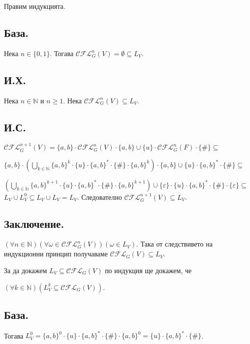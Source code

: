 \documentclass[12pt]{article}
\begin{document}
Правим индукцията.

\subsection*{База.}
Нека \(n \in \{0, 1\}\). Тогава \(\mathcal{CFL}_G^n(V) = \emptyset \subseteq L_V\).

\subsection*{И.Х.}
Нека \(n \in \mathbb{N}\) и \(n \geq 1\). Нека \(\mathcal{CFL}_G^n(V) \subseteq L_V\).

\subsection*{И.С.}
\(\mathcal{CFL}_G^{n + 1}(V) = \{a, b\} \cdot \mathcal{CFL}_G^n(V) \cdot \{a, b\} \cup \{u\} \cdot \mathcal{CFL}_G^n(F) \cdot \{\#\} \subseteq\)

\(\{a, b\} \cdot \left(\displaystyle\bigcup_{k \in \mathbb{N}} \{a, b\}^k \cdot \{u\} \cdot \{a, b\}^* \cdot \{\#\} \cdot \{a, b\}^k\right) \cdot \{a, b\} \cup \{u\} \cdot \{a, b\}^* \cdot \{\#\} \subseteq\)

\(\left(\displaystyle\bigcup_{k \in \mathbb{N}} \{a, b\}^{k + 1} \cdot \{u\} \cdot \{a, b\}^* \cdot \{\#\} \cdot \{a, b\}^{k + 1}\right) \cup \{\varepsilon\} \cdot \{u\} \cdot \{a, b\}^* \cdot \{\#\} \cdot \{\varepsilon\} \subseteq\)
\(L_V \cup L_V^0 \subseteq L_V \cup L_V = L_V\). Следователно \(\mathcal{CFL}_G^{n + 1}(V) \subseteq L_V\).

\subsection*{Заключение.}
\((\forall n \in \mathbb N)(\forall \omega \in \mathcal{CFL}_G^n(V))(\omega \in L_V )\).
Така от следствивето на индукционни принцип получаваме \(\mathcal{CFL}_G(V) \subseteq L_V\).

\vspace*{5mm}

\par За да докажем \(L_V \subseteq \mathcal{CFL}_G(V)\) по индукция ще докажем, че

\((\forall k \in \mathbb{N})(L_V^k \subseteq \mathcal{CFL}_G(V))\).

\subsection*{База.}
Тогава  \(L_V^0 = \{a, b\}^0 \cdot \{u\} \cdot \{a, b\}^* \cdot \{\#\} \cdot \{a, b\}^0 = \{u\} \cdot \{a, b\}^* \cdot \{\#\}\). 
\end{document}
